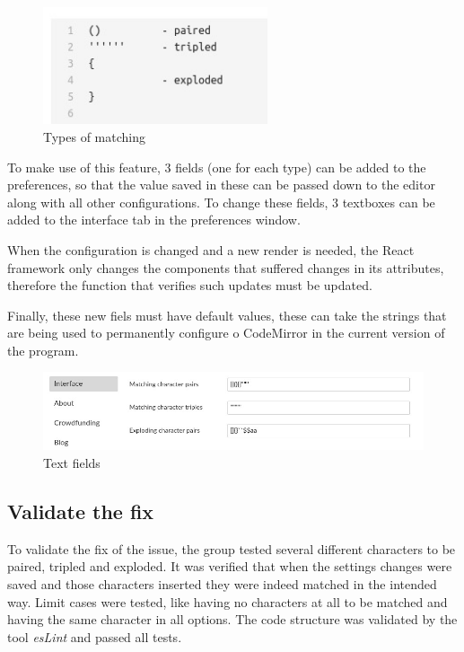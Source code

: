 \begin{figure}
\centering
\includegraphics[width=2.60417in]{../MatchingExamples.jpeg}
\caption{Types of matching}
\end{figure}

To make use of this feature, 3 fields (one for each type) can be added
to the preferences, so that the value saved in these can be passed down
to the editor along with all other configurations. To change these
fields, 3 textboxes can be added to the interface tab in the preferences
window.

When the configuration is changed and a new render is needed, the React
framework only changes the components that suffered changes in its
attributes, therefore the function that verifies such updates must be
updated.

Finally, these new fiels must have default values, these can take the
strings that are being used to permanently configure o CodeMirror in the
current version of the program.

\begin{figure}
\centering
\includegraphics[width=5.72917in]{../MatchingCharactersBoxes.jpeg}
\caption{Text fields}
\end{figure}

\subsection{Validate the fix}\label{validate-the-fix}

To validate the fix of the issue, the group tested several different
characters to be paired, tripled and exploded. It was verified that when
the settings changes were saved and those characters inserted they were
indeed matched in the intended way. Limit cases were tested, like having
no characters at all to be matched and having the same character in all
options. The code structure was validated by the tool \emph{esLint} and
passed all tests.


